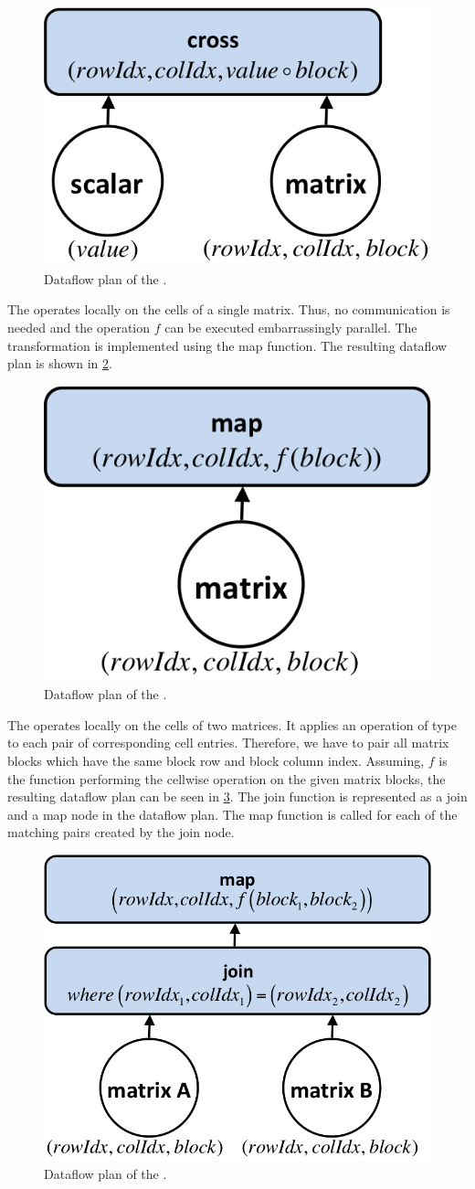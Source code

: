 \begin{figure}[!h]
	\centering
	\includegraphics[width=0.3\linewidth]{images/planScalarMatrixTransformation.png}
	\caption{Dataflow plan of the .}
	\label{fig:planScalarMatrixTransformation}
\end{figure}

The  operates locally on the cells of a single matrix.
Thus, no communication is needed and the  operation $f$ can be executed embarrassingly parallel.
The transformation is implemented using the map function.
The resulting dataflow plan is shown in \cref{fig:planCellwiseMatrixTransformation}.

\begin{figure}[!h]
	\centering
	\includegraphics[width=0.3\linewidth]{images/planCellwiseMatrixTransformation.png}
	\caption{Dataflow plan of the .}
	\label{fig:planCellwiseMatrixTransformation}
\end{figure}

The  operates locally on the cells of two matrices.
It applies an operation of type  to each pair of corresponding cell entries.
Therefore, we have to pair all matrix blocks which have the same block row and block column index.
Assuming, $f$ is the function performing the cellwise operation on the given matrix blocks, the resulting dataflow plan can be seen in \cref{fig:planCellwiseMatrixMatrixTransformation}.
The join function is represented as a join and a map node in the dataflow plan.
The map function is called for each of the matching pairs created by the join node.

\begin{figure}[!h]
	\centering
	\includegraphics[width=0.35\linewidth]{images/planCellwiseMatrixMatrixTransformation.png}
	\caption{Dataflow plan of the .}
	\label{fig:planCellwiseMatrixMatrixTransformation}
\end{figure}

